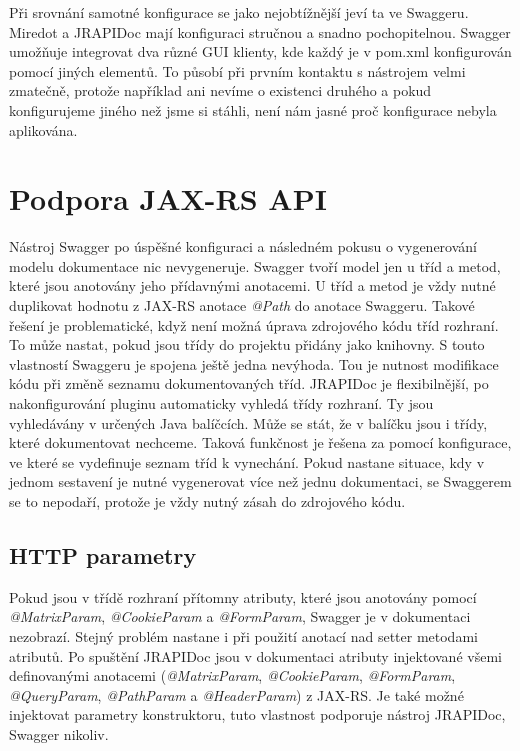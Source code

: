 \documentclass[11pt,twoside,a4paper]{book}
\begin{document}
Při srovnání samotné konfigurace se jako nejobtížnější jeví ta ve Swaggeru.
Miredot a JRAPIDoc mají konfiguraci stručnou a snadno pochopitelnou. Swagger
umožňuje integrovat dva různé GUI klienty, kde každý je v pom.xml konfigurován
pomocí jiných elementů. To působí při prvním kontaktu s nástrojem velmi
zmatečně, protože například ani nevíme o existenci druhého a pokud konfigurujeme
jiného než jsme si stáhli, není nám jasné proč konfigurace nebyla aplikována.

\section{Podpora JAX-RS API}

Nástroj Swagger po úspěšné konfiguraci a následném pokusu o vygenerování modelu
dokumentace nic nevygeneruje. Swagger tvoří model jen u tříd a metod, které jsou
anotovány jeho přídavnými anotacemi. U tříd a metod je vždy nutné duplikovat
hodnotu z JAX-RS anotace {\em @Path} do anotace Swaggeru. Takové řešení je
problematické, když není možná úprava zdrojového kódu tříd rozhraní. To může
nastat, pokud jsou třídy do projektu přidány jako knihovny. S touto vlastností
Swaggeru je spojena ještě jedna nevýhoda. Tou je nutnost modifikace kódu při
změně seznamu dokumentovaných tříd. JRAPIDoc je flexibilnější, po
nakonfigurování pluginu automaticky vyhledá třídy rozhraní.
Ty jsou vyhledávány v určených Java balíčcích. Může se stát, že v balíčku jsou i
třídy, které dokumentovat nechceme. Taková funkčnost je řešena za pomocí
konfigurace, ve které se vydefinuje seznam tříd k vynechání. Pokud nastane
situace, kdy v jednom sestavení je nutné vygenerovat více než jednu dokumentaci,
se Swaggerem se to nepodaří, protože je vždy nutný zásah do zdrojového kódu.

\subsection{HTTP parametry}

Pokud jsou v třídě rozhraní přítomny atributy, které jsou anotovány pomocí {\em
@MatrixParam}, {\em @CookieParam} a {\em @FormParam}, Swagger je v dokumentaci
nezobrazí. Stejný problém nastane i při použití anotací nad setter metodami
atributů. Po spuštění JRAPIDoc jsou v dokumentaci atributy injektované všemi
definovanými anotacemi ({\em @MatrixParam}, {\em @CookieParam}, {\em
@FormParam}, {\em @QueryParam}, {\em @PathParam} a {\em @HeaderParam}) z JAX-RS.
Je také možné injektovat parametry konstruktoru, tuto vlastnost podporuje
nástroj JRAPIDoc, Swagger nikoliv.
\end{document}
